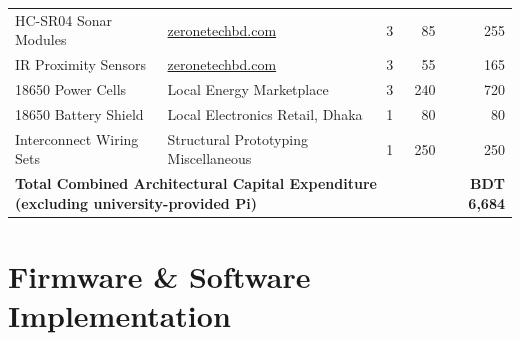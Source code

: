 \documentclass[conference]{IEEEtran}
\begin{document}
\begin{table}[t]
\begin{center}
\begin{tabular}{llcrr}
HC-SR04 Sonar Modules     & \href{https://www.zeronetechbd.com/product/details/ultrasonic-sonar-sensor-hc-sr04snm029}{zeronetechbd.com}           & 3 &   85 &   255 \\
IR Proximity Sensors      & \href{https://www.zeronetechbd.com/product/details/ir-sensor-infrared-obstacle-avoidance-modulesnm004}{zeronetechbd.com}     & 3 &    55 &   165 \\
18650 Power Cells         & Local Energy Marketplace                                                                           & 3 &   240 &   720 \\
18650 Battery Shield      & Local Electronics Retail, Dhaka                                                                    & 1 &    80 &    80 \\
Interconnect Wiring Sets  & Structural Prototyping Miscellaneous                                                               & 1 &   250 &   250 \\
\midrule
\multicolumn{4}{l}{\textbf{Total Combined Architectural Capital Expenditure (excluding university-provided Pi)}} & \textbf{BDT 6,684} \\
\bottomrule
\end{tabular}
\label{tab:cost_matrix}
\end{center}
\end{table}

\section{Firmware \& Software Implementation}
\end{document}
